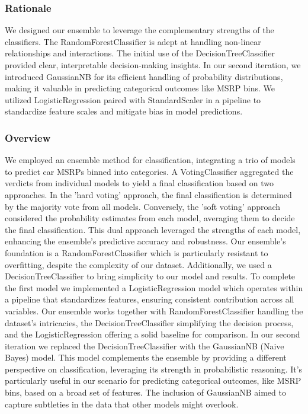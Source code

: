 \documentclass{article}
\begin{document}
\subsubsection{Rationale}
We designed our ensemble to leverage the complementary strengths of the classifiers. The RandomForestClassifier is adept at handling non-linear relationships and interactions. The initial use of the DecisionTreeClassifier provided clear, interpretable decision-making insights. In our second iteration, we introduced GaussianNB for its efficient handling of probability distributions, making it valuable in predicting categorical outcomes like MSRP bins. We utilized LogisticRegression paired with StandardScaler in a pipeline to standardize feature scales and mitigate bias in model predictions.
\newline
\subsubsection{Overview}
We employed an ensemble method for classification, integrating a trio of models to predict car MSRPs binned into categories. A VotingClassifier aggregated the verdicts from individual models to yield a final classification based on two approaches. In the 'hard voting' approach, the final classification is determined by the majority vote from all models. Conversely, the 'soft voting' approach considered the probability estimates from each model, averaging them to decide the final classification. This dual approach leveraged the strengths of each model, enhancing the ensemble's predictive accuracy and robustness.
\newline
\newline
Our ensemble's foundation is a RandomForestClassifier which is particularly resistant to overfitting, despite the complexity of our dataset. Additionally, we used a DecisionTreeClassifier to bring simplicity to our model and results. To complete the first model we implemented a LogisticRegression model which operates within a pipeline that standardizes features, ensuring consistent contribution across all variables. Our ensemble works together with RandomForestClassifier handling the dataset's intricacies, the DecisionTreeClassifier simplifying the decision process, and the LogisticRegression offering a solid baseline for comparison.
\newline
\newline
In our second iteration we replaced the DecisionTreeClassifier with the GaussianNB (Naive Bayes) model. This model complements the ensemble by providing a different perspective on classification, leveraging its strength in probabilistic reasoning. It's particularly useful in our scenario for predicting categorical outcomes, like MSRP bins, based on a broad set of features. The inclusion of GaussianNB aimed to capture subtleties in the data that other models might overlook.
\newline
\end{document}
